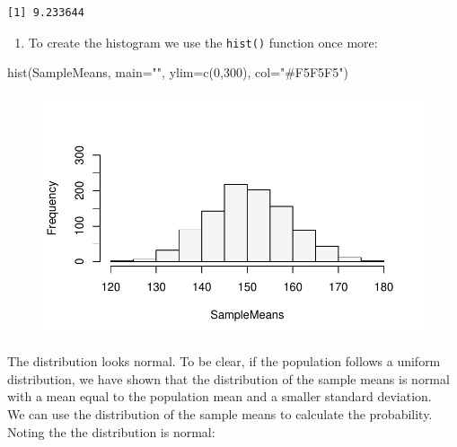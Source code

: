 \documentclass[
  letterpaper,
  DIV=11,
  numbers=noendperiod]{scrreprt}
\newenvironment{Shaded}{\begin{snugshade}}{\end{snugshade}}
\newcommand{\AttributeTok}[1]{\textcolor[rgb]{0.40,0.45,0.13}{#1}}
\newcommand{\DecValTok}[1]{\textcolor[rgb]{0.68,0.00,0.00}{#1}}
\newcommand{\FunctionTok}[1]{\textcolor[rgb]{0.28,0.35,0.67}{#1}}
\newcommand{\NormalTok}[1]{\textcolor[rgb]{0.00,0.23,0.31}{#1}}
\newcommand{\StringTok}[1]{\textcolor[rgb]{0.13,0.47,0.30}{#1}}
\providecommand{\tightlist}{%
  \setlength{\itemsep}{0pt}\setlength{\parskip}{0pt}}\usepackage{longtable,booktabs,array}
\begin{document}
\begin{verbatim}
[1] 9.233644
\end{verbatim}

\begin{enumerate}
\def\labelenumi{\arabic{enumi}.}
\setcounter{enumi}{2}
\tightlist
\item
  To create the histogram we use the \texttt{hist()} function once more:
\end{enumerate}

\begin{Shaded}
\begin{Highlighting}[numbers=left,,]
\FunctionTok{hist}\NormalTok{(SampleMeans, }\AttributeTok{main=}\StringTok{""}\NormalTok{, }\AttributeTok{ylim=}\FunctionTok{c}\NormalTok{(}\DecValTok{0}\NormalTok{,}\DecValTok{300}\NormalTok{), }\AttributeTok{col=}\StringTok{"\#F5F5F5"}\NormalTok{)}
\end{Highlighting}
\end{Shaded}

\begin{figure}[H]

{\centering \includegraphics{./12-InferenceI_files/figure-pdf/unnamed-chunk-8-1.pdf}

}

\end{figure}

The distribution looks normal. To be clear, if the population follows a
uniform distribution, we have shown that the distribution of the sample
means is normal with a mean equal to the population mean and a smaller
standard deviation.\\
We can use the distribution of the sample means to calculate the
probability. Noting the the distribution is normal:
\end{document}
